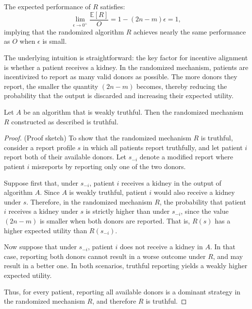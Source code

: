 The expected performance of $R$ satisfies:
\[
\lim_{\epsilon \to 0^+} \frac{\mathbb{E}[R]}{O} = 1 - (2n - m)\epsilon = 1,
\]
implying that the randomized algorithm $R$ achieves nearly the same performance as $O$ when $\epsilon$ is small.

The underlying intuition is straightforward: the key factor for incentive alignment is whether a patient receives a kidney. In the randomized mechanism, patients are incentivized to report as many valid donors as possible. The more donors they report, the smaller the quantity $(2n - m)$ becomes, thereby reducing the probability that the output is discarded and increasing their expected utility.

\begin{lemma}
Let $A$ be an algorithm that is weakly truthful. Then the randomized mechanism $R$ constructed as described is truthful.
\end{lemma}

\begin{proof}
(Proof sketch) To show that the randomized mechanism $R$ is truthful, consider a report profile $s$ in which all patients report truthfully, and let patient $i$ report both of their available donors. Let $s_{-i}$ denote a modified report where patient $i$ misreports by reporting only one of the two donors.

Suppose first that, under $s_{-i}$, patient $i$ receives a kidney in the output of algorithm $A$. Since $A$ is weakly truthful, patient $i$ would also receive a kidney under $s$. Therefore, in the randomized mechanism $R$, the probability that patient $i$ receives a kidney under $s$ is strictly higher than under $s_{-i}$, since the value $(2n - m)$ is smaller when both donors are reported. That is, $R(s)$ has a higher expected utility than $R(s_{-i})$.

Now suppose that under $s_{-i}$, patient $i$ does not receive a kidney in $A$. In that case, reporting both donors cannot result in a worse outcome under $R$, and may result in a better one. In both scenarios, truthful reporting yields a weakly higher expected utility.

Thus, for every patient, reporting all available donors is a dominant strategy in the randomized mechanism $R$, and therefore $R$ is truthful.
\end{proof}

